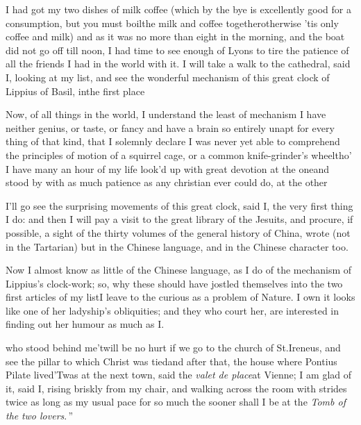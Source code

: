 \documentclass{article}
\begin{document}
I had got my two dishes of milk coffee (which by the bye is
excellently good for a consumption, but you must boil\break the milk
and coffee together\tsk otherwise ’tis only coffee and milk)\tsk
and as it was no more than eight in the morning, and the boat
did not go off till noon,\break
I had time to see enough of Lyons to
tire the patience of all the friends I had in the world with it.
I will take a walk to the cathedral, said I, looking at my list,
and see the wonderful mechanism of this great clock of Lippius
of Basil, in\break the first place\tsh

Now, of all things in the world, I
understand the least of mechanism\tsh\break
I have neither genius, or taste, or fancy\break
\tsk and have a brain so entirely unapt for
every
thing of that kind, that I solemnly declare I was never yet able to comprehend the
principles of motion of a squirrel cage, or a common knife-grinder’s wheel\tsk tho’ I
have many an hour of my life look’d up with great devotion at the one\tsk and stood by
with as much patience as any christian ever could do, at the other\tsh

I’ll go see the surprising movements of this great clock, said I, the very first
thing I do: and then I will pay a visit to the great library of the Jesuits, and
procure, if possible, a sight of the thirty volumes of the general history of China,
wrote (not in the Tartarian) but in the Chinese language, and in the Chinese
character too.

Now I almost know as little of the\break
Chinese language, as I do of the mechanism of
Lippius’s clock-work; so,\break
why these should have jostled themselves into the two
first articles of my list\tsh I leave to the curious as a pro\-blem of Nature.  I own
it looks like one of her ladyship’s obliquities; and they who court her, are
interested in finding out her humour as much as I.

\noindent
{}\break
{}
who stood behind me\tsh ’twill be no hurt if we go to the church of
St.\@ Ire\-neus, and see the pillar to which Christ was tied\tsh and after that, the
house where Pontius Pilate lived\tsh ’Twas at
the next town, said the \textit{valet de place}\tsk at Vienne; I
am glad of it, said I, rising briskly from my chair, and walking
across the room with strides twice as long as my usual pace\tsh
\lqq for so much\break
\lqq the sooner shall I be at the \textit{Tomb of the}\break
\lqq \textit{two lovers}.\,”
\end{document}
